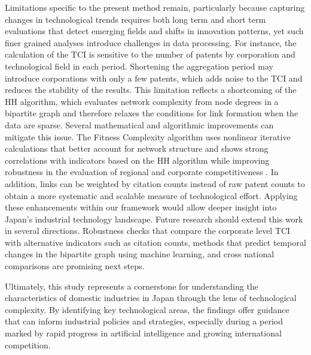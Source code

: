Limitations specific to the present method remain, particularly because capturing changes in technological trends requires both long term and short term evaluations that detect emerging fields and shifts in innovation patterns, yet such finer grained analyses introduce challenges in data processing.  
For instance, the calculation of the TCI is sensitive to the number of patents by corporation and technological field in each period.  
Shortening the aggregation period may introduce corporations with only a few patents, which adds noise to the TCI and reduces the stability of the results\cite{PintarEssletzbichler2022}.  
This limitation reflects a shortcoming of the HH algorithm, which evaluates network complexity from node degrees in a bipartite graph and therefore relaxes the conditions for link formation when the data are sparse.  
Several mathematical and algorithmic improvements can mitigate this issue.  
The Fitness Complexity algorithm \cite{Tacchella2012} uses nonlinear iterative calculations that better account for network structure and shows strong correlations with indicators based on the HH algorithm while improving robustness in the evaluation of regional and corporate competitiveness \cite{Wu2016,Albeaik2017}.  
In addition, links can be weighted by citation counts instead of raw patent counts to obtain a more systematic and scalable measure of technological effort.  
Applying these enhancements within our framework would allow deeper insight into Japan's industrial technology landscape.  
Future research should extend this work in several directions.  
Robustness checks that compare the corporate level TCI with alternative indicators such as citation counts, methods that predict temporal changes in the bipartite graph using machine learning, and cross national comparisons are promising next steps.

Ultimately, this study represents a cornerstone for understanding the characteristics of domestic industries in Japan through the lens of technological complexity.  
By identifying key technological areas, the findings offer guidance that can inform industrial policies and strategies, especially during a period marked by rapid progress in artificial intelligence and growing international competition.  
